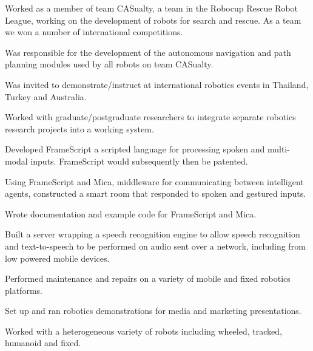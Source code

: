 \documentclass[a4paper]{awesome-deedy}
\begin{document}
\begin{minipage}[t]{0.66\textwidth}
\begin{tightemize}
\item Worked as a member of team CASualty, a team in the Robocup Rescue Robot League, working on the development of robots for search and rescue.  As a team we won a number of international competitions.
\item Was responsible for the development of the autonomous navigation and path planning modules used by all robots on team CASualty.
\item Was invited to demonstrate/instruct at international robotics events in Thailand, Turkey and Australia.
\item Worked with graduate/postgraduate researchers to integrate separate robotics research projects into a working system.
\item Developed FrameScript a scripted language for processing spoken and multi-modal inputs.  FrameScript would subsequently then be patented.
\item Using FrameScript and Mica, middleware for communicating between intelligent agents, constructed a smart room that responded to spoken and gestured inputs.
\item Wrote documentation and example code for FrameScript and Mica.
\item Built a server wrapping a speech recognition engine to allow speech recognition and text-to-speech to be performed on audio sent over a network, including from low powered mobile devices.
\item Performed maintenance and repairs on a variety of mobile and fixed robotics platforms.
\item Set up and ran robotics demonstrations for media and marketing presentations.
\item Worked with a heterogeneous variety of robots including wheeled, tracked, humanoid and fixed.
\end{tightemize}
\sectionsep


\end{minipage}
\end{document}
